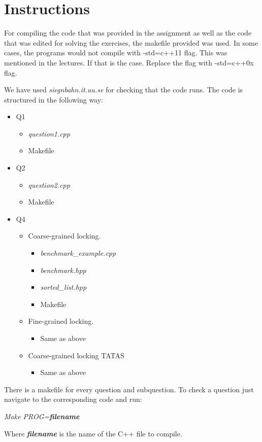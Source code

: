 \section{Instructions}

For compiling the code that was provided in the assignment as well as the 
code that was edited for solving the exercises, the makefile provided was used.
In some cases, the programs would not compile with -std=c++11 flag. This was mentioned
in the lectures. If that is the case. Replace the flag with -std=c++0x flag.

We have used \textit{siegnbahn.it.uu.se} for checking that the code runs.
The code is structured in the following way:

\begin{itemize}
    \item Q1
        \begin{itemize}
            \item \textit{question1.cpp}
            \item Makefile
        \end{itemize}
    \item Q2
        \begin{itemize}
            \item \textit{question2.cpp}
            \item Makefile
        \end{itemize}
    \item Q4
        \begin{itemize}
            \item Coarse-grained locking.
                \begin{itemize}
                    \item \textit{benchmark\_example.cpp}
                    \item \textit{benchmark.hpp}
                    \item \textit{sorted\_list.hpp}
                    \item Makefile
                \end{itemize}
            \item Fine-grained locking.
                \begin{itemize}
                    \item Same as above
                \end{itemize}
            \item Coarse-grained locking TATAS
                \begin{itemize}
                    \item Same as above
                \end{itemize}
        \end{itemize}
\end{itemize}

There is a makefile for every question and subquestion. To check a question
just navigate to the corresponding code and run:

\begin{center}
    \textit{Make PROG=\textbf{filename}}
\end{center}

Where \textit{\textbf{filename}} is the name of the C++ file to compile.